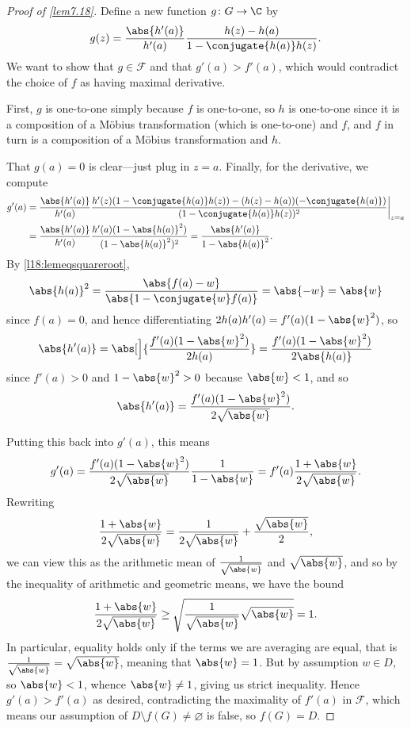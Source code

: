 \begin{proof}[Proof of \autoref{lem7.18}]
	Define a new function $g \colon G \to \C$ by
	\[
		g(z) = \frac{\abs{h'(a)}}{h'(a)} \frac{h(z) - h(a)}{1 - \conjugate{h(a)} h(z)}.
	\]
	We want to show that $g \in \mathcal{F}$ and that $g'(a) > f'(a)$, which would contradict the choice of $f$ as having maximal derivative.

	First, $g$ is one-to-one simply because $f$ is one-to-one, so $h$ is one-to-one since it is a composition of a Möbius transformation (which is one-to-one) and $f$, and $f$ in turn is a composition of a Möbius transformation and $h$.

	That $g(a) = 0$ is clear---just plug in $z = a$.
	Finally, for the derivative, we compute
	\begin{align*}
		g'(a) &= \frac{\abs{h'(a)}}{h'(a)} \frac{h'(z) (1 - \conjugate{h(a)} h(z)) - (h(z) - h(a)) (- \conjugate{h(a)})}{(1 - \conjugate{h(a)} h(z))^2} \biggr\rvert_{z = a} \\
		&= \frac{\abs{h'(a)}}{h'(a)} \frac{h'(a) (1 - \abs{h(a)}^2)}{(1 - \abs{h(a)}^2)^2} = \frac{\abs{h'(a)}}{1 - \abs{h(a)}^2}.
	\end{align*}
	By \autoref{l18:lemeqsquareroot},
	\[
		\abs{h(a)}^2 = \frac{\abs{f(a) - w}}{\abs{1 - \conjugate{w} f(a)}} = \abs{-w} = \abs{w}
	\]
	since $f(a) = 0$, and hence differentiating $2 h(a) h'(a) = f'(a) (1 -\abs{w}^2)$, so
	\[
		\abs{h'(a)} = \abs[\Big]{\frac{f'(a) (1 - \abs{w}^2)}{2 h(a)}} = \frac{f'(a) (1 - \abs{w}^2)}{2 \abs{h(a)}}
	\]
	since $f'(a) > 0$ and $1 - \abs{w}^2 > 0$ because $\abs{w} < 1$, and so
	\[
		\abs{h'(a)} = \frac{f'(a) (1 - \abs{w}^2)}{2 \sqrt{\abs{w}}}.
	\]

	Putting this back into $g'(a)$, this means
	\[
		g'(a) = \frac{f'(a) (1 - \abs{w}^2)}{2 \sqrt{\abs{w}}} \frac{1}{1 - \abs{w}} = f'(a) \frac{1 + \abs{w}}{2 \sqrt{\abs{w}}}.
	\]
	Rewriting
	\[
		\frac{1 + \abs{w}}{2 \sqrt{\abs{w}}} = \frac{1}{2 \sqrt{\abs{w}}} + \frac{\sqrt{\abs{w}}}{2},
	\]
	we can view this as the arithmetic mean of $\frac{1}{\sqrt{\abs{w}}}$ and $\sqrt{\abs{w}}$, and so by the inequality of arithmetic and geometric means, we have the bound
	\[
		\frac{1 + \abs{w}}{2 \sqrt{\abs{w}}} \geq \sqrt{\frac{1}{\sqrt{\abs{w}}} \sqrt{\abs{w}}} = 1.
	\]
	In particular, equality holds only if the terms we are averaging are equal, that is $\frac{1}{\sqrt{\abs{w}}} = \sqrt{\abs{w}}$, meaning that $\abs{w} = 1$.
	But by assumption $w \in D$, so $\abs{w} < 1$, whence $\abs{w} \neq 1$, giving us strict inequality.
	Hence $g'(a) > f'(a)$ as desired, contradicting the maximality of $f'(a)$ in $\mathcal{F}$, which means our assumption of $D \setminus f(G) \neq \varnothing$ is false, so $f(G) = D$.


\end{proof}
